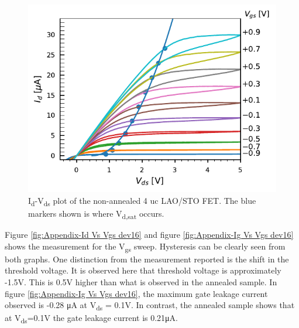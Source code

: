 \documentclass[11pt,a4paper]{report}
\begin{document}
\begin{figure}[!h]
    \centering
    \includegraphics[scale=1]{Figures/Batch1/Dev16_Vds_sweep-Ids.pdf}
    \caption{I\textsubscript{d}-V\textsubscript{ds} plot of the non-annealed 4 uc LAO/STO FET. The blue markers shown is where V\textsubscript{d,sat} occurs.}
    \label{fig:Appendix-Id Vs Vds dev16}
\end{figure}

Figure \ref{fig:Appendix-Id Vs Vgs dev16} and figure \ref{fig:Appendix-Ig Vs Vgs dev16} shows the measurement for the V\textsubscript{gs} sweep. Hysteresis can be clearly seen from both graphs. One distinction from the measurement reported is the shift in the threshold voltage. It is observed here that threshold voltage is approximately -1.5V. This is 0.5V higher than what is observed in the annealed sample. In figure \ref{fig:Appendix-Ig Vs Vgs dev16}, the maximum gate leakage current observed is -0.28 \si{\micro A} at V\textsubscript{ds} = 0.1V. In contrast, the annealed sample shows that at V\textsubscript{ds}=0.1V the gate leakage current is 0.21\si{\micro A}.
\end{document}
